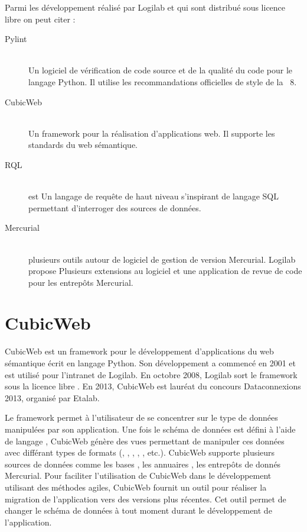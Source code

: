 Parmi les développement réalisé par Logilab et qui sont distribué sous licence
libre on peut citer : 
\begin{description} 
    \item[Pylint]\hfill\\ 
        Un logiciel de vérification de code source et de la qualité du code 
        pour le langage Python. Il utilise les recommandations officielles de 
        style de la  ~8.  
        \item[CubicWeb]\hfill\\ 
            Un framework pour la réalisation d’applications web. Il supporte 
            les standards du web sémantique.  
        \item[RQL]\hfill\\ 
             est Un langage de requête de haut niveau 
            s’inspirant de langage SQL permettant d'interroger des sources de 
            données.  
        \item[Mercurial] \hfill\\ 
            plusieurs outils autour de logiciel de gestion de version Mercurial. 
            Logilab propose Plusieurs extensions au logiciel et une application 
            de revue de code pour les entrepôts Mercurial.  
\end{description}



\section{CubicWeb} 
CubicWeb est un framework pour le développement d'applications du web sémantique 
écrit en langage Python. Son développement a commencé en 2001 et est utilisé pour 
l'intranet de Logilab. En octobre 2008, Logilab sort le framework sous la licence 
libre . En 2013, CubicWeb est lauréat du concours 
Dataconnexions 2013, organisé par Etalab\cite{etalab}.

Le framework permet à l'utilisateur de se concentrer sur le type de données
manipulées par son application. Une fois le schéma de données est défini à
l'aide de langage , CubicWeb génère des vues permettant de
manipuler ces données avec différant types de formats (,
, , ,
, etc.). CubicWeb supporte plusieurs sources de données comme
les bases , les annuaires , les entrepôts
de donnés Mercurial. Pour faciliter l'utilisation de CubicWeb dans le
développement utilisant des méthodes agiles, CubicWeb fournit un outil pour
réaliser la migration de l'application vers des versions plus récentes. Cet
outil permet de changer le schéma de données à tout moment durant le
développement de l'application.



